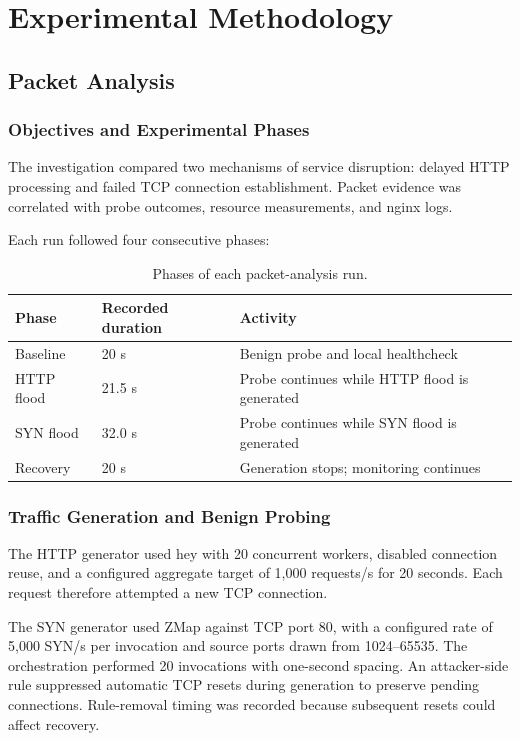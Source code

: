 \section{Experimental Methodology}
\label{sec:methodology}

\subsection{Packet Analysis}
\label{sec:packet-analysis}

\subsubsection{Objectives and Experimental Phases}

The investigation compared two mechanisms of service disruption: delayed HTTP processing and failed TCP connection establishment. Packet evidence was correlated with probe outcomes, resource measurements, and nginx logs.

Each run followed four consecutive phases:

\begin{table}[htbp]
  \centering
  \caption{Phases of each packet-analysis run.}
  \label{tab:packet-phases}
  \begin{tabularx}{\linewidth}{@{}l l Y@{}}
    \toprule
    \textbf{Phase} & \textbf{Recorded duration} & \textbf{Activity} \\
    \midrule
    Baseline & 20 s & Benign probe and local healthcheck \\
    HTTP flood & 21.5 s & Probe continues while HTTP flood is generated \\
    SYN flood & 32.0 s & Probe continues while SYN flood is generated \\
    Recovery & 20 s & Generation stops; monitoring continues \\
    \bottomrule
  \end{tabularx}
\end{table}

\subsubsection{Traffic Generation and Benign Probing}

The HTTP generator used hey with 20 concurrent workers, disabled connection reuse, and a configured aggregate target of 1,000 requests/s for 20 seconds. Each request therefore attempted a new TCP connection.

The SYN generator used ZMap against TCP port 80, with a configured rate of 5,000 SYN/s per invocation and source ports drawn from 1024--65535. The orchestration performed 20 invocations with one-second spacing. An attacker-side rule suppressed automatic TCP resets during generation to preserve pending connections. Rule-removal timing was recorded because subsequent resets could affect recovery.

